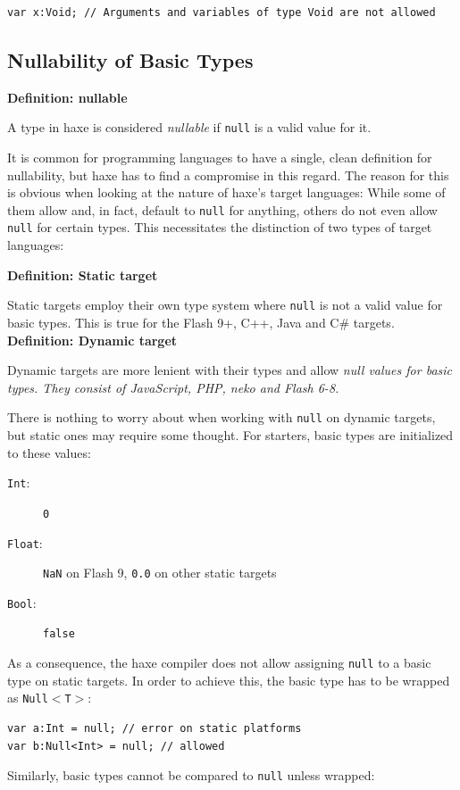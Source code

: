 \documentclass{article}
\newcommand{\target}[1]{#1}
\newcommand{\type}[1]{\texttt{#1}}
\newcommand{\expr}[1]{\texttt{#1}}
\newenvironment{myshaded}
  {\def\FrameCommand{\fboxsep=\topsep\colorbox{bgcolor}}%
  \MakeFramed {\advance\hsize-\width \FrameRestore}}%
 {\endMakeFramed}
\newcommand{\define}[3][Definition]
	{\begin{myshaded}\noindent\textbf{#1: #2}\par\nobreak\noindent\ignorespaces#3\label{def:#2}\end{myshaded}}
\begin{document}
\begin{lstlisting}
var x:Void; // Arguments and variables of type Void are not allowed
\end{lstlisting}




\subsection{Nullability of Basic Types}
\label{Nullability}

\define{nullable}{A type in haxe is considered \emph{nullable} if \expr{null} is a valid value for it.}

It is common for programming languages to have a single, clean definition for nullability, but haxe has to find a compromise in this regard. The reason for this is obvious when looking at the nature of haxe's target languages: While some of them allow and, in fact, default to \expr{null} for anything, others do not even allow \expr{null} for certain types. This necessitates the distinction of two types of target languages:

\define{Static target}{Static targets employ their own type system where \expr{null} is not a valid value for basic types. This is true for the \target{Flash 9+}, \target{C++}, \target{Java} and \target{C\#} targets.}
\define{Dynamic target}{Dynamic targets are more lenient with their types and allow \it{null} values for basic types. They consist of \target{JavaScript}, \target{PHP}, \target{neko} and \target{Flash 6-8}.}

There is nothing to worry about when working with \expr{null} on dynamic targets, but static ones may require some thought. For starters, basic types are initialized to these values:

\begin{description}
	\item[\type{Int}:] \expr{0}
	\item[\type{Float}:] \expr{NaN} on \target{Flash 9}, \expr{0.0} on other static targets
	\item[\type{Bool}:] \expr{false}
\end{description}
As a consequence, the haxe compiler does not allow assigning \expr{null} to a basic type on static targets. In order to achieve this, the basic type has to be wrapped as \type{Null$<$T$>$}:

\begin{lstlisting}
var a:Int = null; // error on static platforms
var b:Null<Int> = null; // allowed
\end{lstlisting}
Similarly, basic types cannot be compared to \expr{null} unless wrapped:
\end{document}

